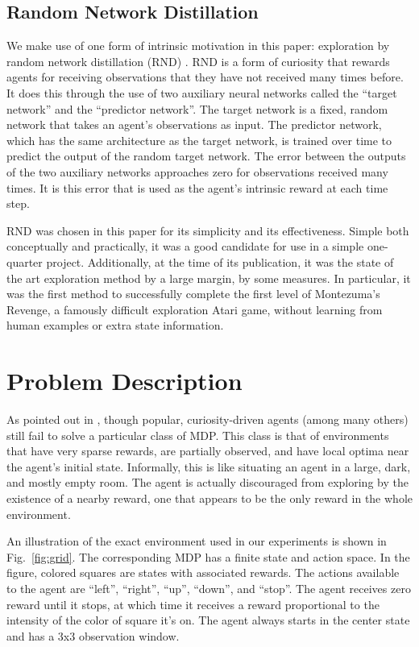 \documentclass[11pt,journal,compsoc]{IEEEtran}
\begin{document}
	\subsection{Random Network Distillation}
	We make use of one form of intrinsic motivation in this paper: exploration by random network distillation (RND) \cite{rnd}. RND is a form of curiosity that rewards agents for receiving observations that they have not received many times before. It does this through the use of two auxiliary neural networks called the ``target network'' and the ``predictor network''. The target network is a fixed, random network that takes an agent's observations as input. The predictor network, which has the same architecture as the target network, is trained over time to predict the output of the random target network. The error between the outputs of the two auxiliary networks approaches zero for observations received many times. It is this error that is used as the agent's intrinsic reward at each time step.
	
	RND was chosen in this paper for its simplicity and its effectiveness. Simple both conceptually and practically, it was a good candidate for use in a simple one-quarter project. Additionally, at the time of its publication, it was the state of the art exploration method by a large margin, by some measures. In particular, it was the first method to successfully complete the first level of Montezuma's Revenge, a famously difficult exploration Atari game, without learning from human examples or extra state information.
	
	\section{Problem Description}
	As pointed out in \cite{malthusian_rl}, though popular, curiosity-driven agents (among many others) still fail to solve a particular class of MDP. This class is that of environments that have very sparse rewards, are partially observed, and have local optima near the agent's initial state. Informally, this is like situating an agent in a large, dark, and mostly empty room. The agent is actually discouraged from exploring by the existence of a nearby reward, one that appears to be the only reward in the whole environment. 
	
	An illustration of the exact environment used in our experiments is shown in Fig.~\ref{fig:grid}. The corresponding MDP has a finite state and action space. In the figure, colored squares are states with associated rewards. The actions available to the agent are ``left'', ``right'', ``up'', ``down'', and ``stop''. The agent receives zero reward until it stops, at which time it receives a reward proportional to the intensity of the color of square it's on. The agent always starts in the center state and has a 3x3 observation window.
	
\end{document}
